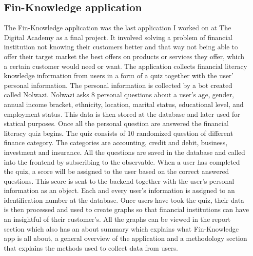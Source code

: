 \documentclass[paper=a4, fontsize=11pt]{scrartcl}
\numberwithin{equation}{section}		%
\numberwithin{figure}{section}			%
\numberwithin{table}{section}				%
\begin{document}
\subsection{ Fin-Knowledge application }
The Fin-Knowledge application was the last application I worked on at The Digital Academy as a final project. It involved solving a problem of financial institution not knowing their customers better and that way not being able to offer their target market the best offers on products or services they offer, which a certain customer would need or want. The application collects financial literacy knowledge information from users in a form of a quiz together with the user’ personal information. The personal information is collected by a bot created called Nolwazi. 
Nolwazi asks 8 personal questions about a user’s age, gender, annual income bracket, ethnicity, location, marital status, educational level, and employment status. This data is then stored at the database and later used for statical purposes. Once all the personal question are answered the financial literacy quiz begins. The quiz consists of 10 randomized question of different finance category. The categories are accounting, credit and debit, business, investment and insurance. All the questions are saved in the database and called into the frontend by subscribing to the observable. 
When a user has completed the quiz, a score will be assigned to the user based on the correct answered questions. This score is sent to the backend together with the user’s personal information as an object. Each and every user’s information is assigned to an identification number at the database. Once users have took the quiz, their data is then processed and used to create graphs so that financial institutions can have an insightful of their customer’s. All the graphs can be viewed in the report section which also has an about summary which explains what Fin-Knowledge app is all about, a general overview of the application and a methodology section that explains the methods used to collect data from users. 


\end{document}
